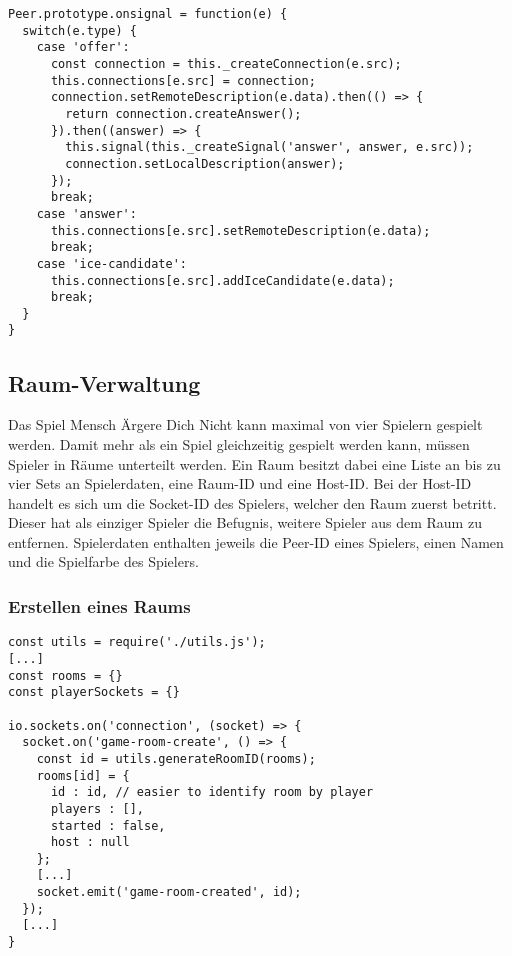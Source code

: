 \vspace{5pt}
\lstset{language=js, style=STYLE_CODE_JS}
\begin{singlespace}
\begin{minipage}{\textwidth}
\begin{lstlisting}[caption={Funktion zum Verarbeiten von Signalnachrichten -- Peer.js}, captionpos=b, label={lst:onsignal}]
Peer.prototype.onsignal = function(e) {
  switch(e.type) {
    case 'offer':
      const connection = this._createConnection(e.src);
      this.connections[e.src] = connection;
      connection.setRemoteDescription(e.data).then(() => {
        return connection.createAnswer();
      }).then((answer) => {
        this.signal(this._createSignal('answer', answer, e.src));
        connection.setLocalDescription(answer);
      });
      break;
    case 'answer':
      this.connections[e.src].setRemoteDescription(e.data);
      break;
    case 'ice-candidate':
      this.connections[e.src].addIceCandidate(e.data);
      break;
  }
}
\end{lstlisting}
\end{minipage}
\end{singlespace}

\subsection{Raum-Verwaltung}
Das Spiel \glqq{}Mensch Ärgere Dich Nicht\grqq{} kann maximal von vier Spielern gespielt werden. Damit mehr als ein Spiel gleichzeitig gespielt werden kann, müssen Spieler in \glqq{}Räume\grqq{} unterteilt werden. Ein Raum besitzt dabei eine Liste an bis zu vier Sets an Spielerdaten, eine Raum-ID und eine Host-ID. Bei der Host-ID handelt es sich um die Socket-ID des Spielers, welcher den Raum zuerst betritt. Dieser hat als einziger Spieler die Befugnis, weitere Spieler aus dem Raum zu entfernen. Spielerdaten enthalten jeweils die Peer-ID eines Spielers, einen Namen und die Spielfarbe des Spielers.

\subsubsection{Erstellen eines Raums}
\vspace{5pt}
\lstset{language=js, style=STYLE_CODE_JS}
\begin{singlespace}
\begin{minipage}{\textwidth}
\begin{lstlisting}[caption={Event zum Erstellen eines Raums -- Server.js}, captionpos=b, label={lst:imamakedaroom}]
const utils = require('./utils.js');
[...]
const rooms = {}
const playerSockets = {}

io.sockets.on('connection', (socket) => {
  socket.on('game-room-create', () => {
    const id = utils.generateRoomID(rooms);
    rooms[id] = {
      id : id, // easier to identify room by player
      players : [],
      started : false,
      host : null
    };
    [...]	
    socket.emit('game-room-created', id);
  });
  [...]
}
\end{lstlisting}
\end{minipage}
\end{singlespace}

